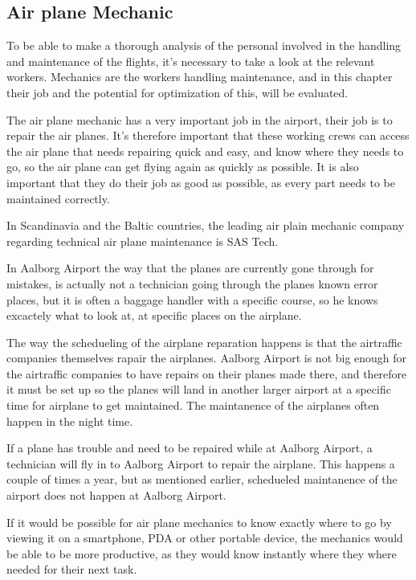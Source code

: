 \subsection{Air plane Mechanic}
To be able to make a thorough analysis of the personal involved in the handling and maintenance of the flights, it's necessary to take a look at the relevant workers. Mechanics are the workers handling maintenance, and in this chapter their job and the potential for optimization of this, will be evaluated.

The air plane mechanic has a very important job in the airport, their job is to repair the air planes. It's therefore important that these working crews can access the air plane that needs repairing quick and easy, and know where they needs to go, so the air plane can get flying again as quickly as possible. It is also important that they do their job as good as possible, as every part needs to be maintained correctly.

In Scandinavia and the Baltic countries, the leading air plain mechanic company regarding technical air plane maintenance is SAS Tech\cite{sas_tech_mechanic}.

In Aalborg Airport the way that the planes are currently gone through for mistakes, is actually not a technician going through the planes known error places, but it is often a baggage handler with a specific course, so he knows excactely what to look at, at specific places on the airplane.

The way the schedueling of the airplane reparation happens is that the airtraffic companies themselves rapair the airplanes. Aalborg Airport is not big enough for the airtraffic companies to have repairs on their planes made there, and therefore it must be set up so the planes will land in another larger airport at a specific time for airplane to get maintained. The maintanence of the airplanes often happen in the night time.

If a plane has trouble and need to be repaired while at Aalborg Airport, a technician will fly in to Aalborg Airport to repair the airplane. This happens a couple of times a year, but as mentioned earlier, schedueled maintanence of the airport does not happen at Aalborg Airport.

If it would be possible for air plane mechanics to know exactly where to go by viewing it on a smartphone, PDA or other portable device, the mechanics would be able to be more productive, as they would know instantly where they where needed for their next task. 

